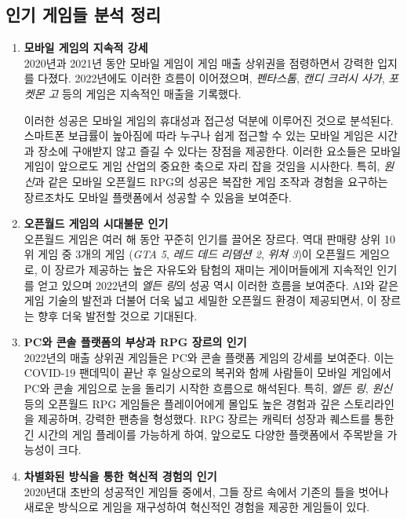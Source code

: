 \documentclass[a4paper, 11pt]{article}
\begin{document}
\subsection{인기 게임들 분석 정리}
\begin{enumerate}[label=\arabic*.]
    \item \textbf{모바일 게임의 지속적 강세} \\
    2020년과 2021년 동안 모바일 게임이 게임 매출 상위권을 점령하면서 강력한 입지를 다졌다. 2022년에도 이러한 흐름이 이어졌으며, \textit{펜타스톰}, \textit{캔디 크러시 사가}, \textit{포켓몬 고} 등의 게임은 지속적인 매출을 기록했다.

    이러한 성공은 모바일 게임의 휴대성과 접근성 덕분에 이루어진 것으로 분석된다. 스마트폰 보급률이 높아짐에 따라 누구나 쉽게 접근할 수 있는 모바일 게임은 시간과 장소에 구애받지 않고 즐길 수 있다는 장점을 제공한다. 이러한 요소들은 모바일 게임이 앞으로도 게임 산업의 중요한 축으로 자리 잡을 것임을 시사한다. 특히, \textit{원신}과 같은 모바일 오픈월드 RPG의 성공은 복잡한 게임 조작과 경험을 요구하는 장르조차도 모바일 플랫폼에서 성공할 수 있음을 보여준다.

    \item \textbf{오픈월드 게임의 시대불문 인기} \\
    오픈월드 게임은 여러 해 동안 꾸준히 인기를 끌어온 장르다. 역대 판매량 상위 10위 게임 중 3개의 게임 (\textit{GTA 5}, \textit{레드 데드 리뎀션 2}, \textit{위쳐 3})이 오픈월드 게임으로, 이 장르가 제공하는 높은 자유도와 탐험의 재미는 게이머들에게 지속적인 인기를 얻고 있으며 2022년의 \textit{엘든 링}의 성공 역시 이러한 흐름을 보여준다. AI와 같은 게임 기술의 발전과 더불어 더욱 넓고 세밀한 오픈월드 환경이 제공되면서, 이 장르는 향후 더욱 발전할 것으로 기대된다.

    \item \textbf{PC와 콘솔 플랫폼의 부상과 RPG 장르의 인기} \\
    2022년의 매출 상위권 게임들은 PC와 콘솔 플랫폼 게임의 강세를 보여준다. 이는 COVID-19 팬데믹이 끝난 후 일상으로의 복귀와 함께 사람들이 모바일 게임에서 PC와 콘솔 게임으로 눈을 돌리기 시작한 흐름으로 해석된다. 특히, \textit{엘든 링}, \textit{원신} 등의 오픈월드 RPG 게임들은 플레이어에게 몰입도 높은 경험과 깊은 스토리라인을 제공하며, 강력한 팬층을 형성했다. RPG 장르는 캐릭터 성장과 퀘스트를 통한 긴 시간의 게임 플레이를 가능하게 하여, 앞으로도 다양한 플랫폼에서 주목받을 가능성이 크다.

    \item \textbf{차별화된 방식을 통한 혁신적 경험의 인기} \\
    2020년대 초반의 성공적인 게임들 중에서, 그들 장르 속에서 기존의 틀을 벗어나 새로운 방식으로 게임을 재구성하여 혁신적인 경험을 제공한 게임들이 있다.
    

\end{enumerate}
\end{document}
